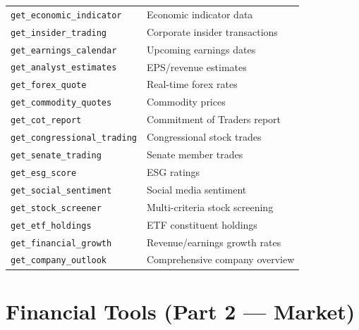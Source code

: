 \begin{longtable}{p{5cm}p{8cm}}
\texttt{get\_economic\_indicator} & Economic indicator data \\
\texttt{get\_insider\_trading} & Corporate insider transactions \\
\texttt{get\_earnings\_calendar} & Upcoming earnings dates \\
\texttt{get\_analyst\_estimates} & EPS/revenue estimates \\
\texttt{get\_forex\_quote} & Real-time forex rates \\
\texttt{get\_commodity\_quotes} & Commodity prices \\
\texttt{get\_cot\_report} & Commitment of Traders report \\
\texttt{get\_congressional\_trading} & Congressional stock trades \\
\texttt{get\_senate\_trading} & Senate member trades \\
\texttt{get\_esg\_score} & ESG ratings \\
\texttt{get\_social\_sentiment} & Social media sentiment \\
\texttt{get\_stock\_screener} & Multi-criteria stock screening \\
\texttt{get\_etf\_holdings} & ETF constituent holdings \\
\texttt{get\_financial\_growth} & Revenue/earnings growth rates \\
\texttt{get\_company\_outlook} & Comprehensive company overview \\
\bottomrule
\end{longtable}

\section{Financial Tools (Part 2 --- Market)}
\label{sec:tools:fin-market}

